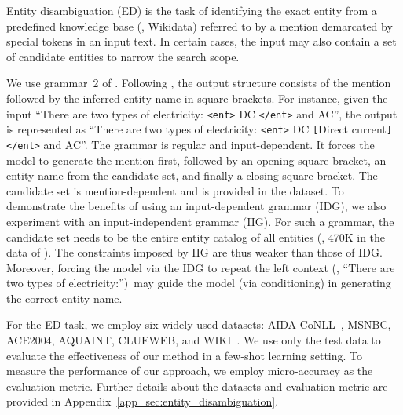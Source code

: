  Entity disambiguation (ED) is the task of identifying the exact entity from a predefined knowledge base (\eg, Wikidata) referred to by a mention demarcated by special tokens in an input text.
In certain cases, the input may also contain a set of candidate entities to narrow the search scope.


We use grammar~2 of .
Following \citet{decao2021autoregressive}, the output structure consists of the mention followed by the inferred entity name in square brackets.
For instance, given the input ``There are two types of electricity: \texttt{<ent>} DC \texttt{</ent>} and AC'', the output is represented as ``There are two types of electricity: \texttt{<ent>} DC \texttt{[}Direct current\texttt{]} \texttt{</ent>} and AC''.
%
The grammar is regular and input-dependent.
It forces the model to generate the mention first, followed by an opening square bracket, an entity name from the candidate set, and finally a closing square bracket.
The candidate set is mention-dependent and is provided in the dataset.
%
To demonstrate the benefits of using an input-dependent grammar (IDG), we also experiment with an input-independent grammar (IIG).
For such a grammar, the candidate set needs to be the entire entity catalog of all entities (\eg, 470K in the data of \citet{le-titov-2018-improving}).
The constraints imposed by IIG are thus weaker than those of IDG.
Moreover, forcing the model via the IDG to repeat the left context (\eg, ``There are two types of electricity:'')\ may guide the model (via conditioning) in generating the correct entity name.




For the ED task, we employ six widely used datasets: AIDA-CoNLL~\cite{hoffart-etal-2011-robust}, MSNBC, ACE2004, AQUAINT, CLUEWEB, and WIKI~\cite{ClueWeb, ner_dataset}.
We use only the test data to evaluate the effectiveness of our method in a few-shot learning setting.
%
To measure the performance of our approach, we employ micro\hyp accuracy as the evaluation metric.
%
Further details about the datasets and evaluation metric are provided in Appendix~\ref{app_sec:entity_disambiguation}.

% 


